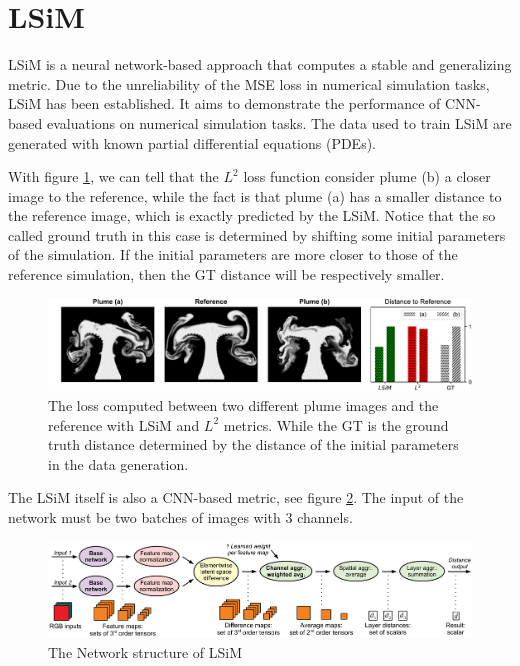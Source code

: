 \documentclass[a4paper,12pt,twoside]{report}
\begin{document}
\section{LSiM}

LSiM \cite{kohl2020learning} is a neural network-based approach that computes a stable and generalizing metric. Due to the unreliability of the MSE loss in numerical simulation tasks, LSiM has been established. It aims to demonstrate the performance of CNN-based evaluations on numerical simulation tasks. The data used to train LSiM are generated with known partial differential equations (PDEs). 

With figure \ref{lsimcompare}, we can tell that the $L^2$ loss function consider plume (b) a closer image to the reference, while the fact is that plume (a) has a smaller distance to the reference image, which is exactly predicted by the LSiM. Notice that the so called ground truth in this case is determined by shifting some initial parameters of the simulation. If the initial parameters are more closer to those of the reference simulation, then the GT distance will be respectively smaller.

\begin{figure}
\centering
\includegraphics[width=1.0\textwidth]{Plumes.pdf}
\caption{The loss computed between two different plume images and the reference with LSiM and $L^2$ metrics. While the GT is the ground truth distance determined by the distance of the initial parameters in the data generation. }
\label{lsimcompare}
\end{figure}
The LSiM itself is also a CNN-based metric, see figure \ref{lsim}. The input of the network must be two batches of images with 3 channels.
\begin{figure}
\centering
\includegraphics[width=1.0\textwidth]{DistanceComputation.pdf}
\caption{The Network structure of LSiM}
\label{lsim}
\end{figure}
\end{document}
